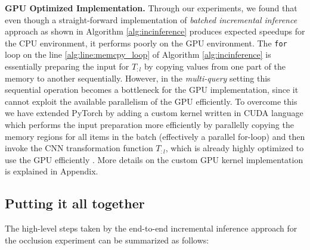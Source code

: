 \vspace{2mm}
\noindent \textbf{GPU Optimized Implementation.}
Through our experiments, we found that even though a straight-forward implementation of \textit{batched incremental inference} approach as shown in Algorithm \ref{alg:incinference} produces expected speedups for the CPU environment, it performs poorly on the GPU environment.
The \texttt{for} loop on the line \ref{alg:line:memcpy_loop} of Algorithm \ref{alg:incinference} is essentially preparing the input for $T_{:l}$ by copying values from one part of the memory to another sequentially.
However, in the \textit{multi-query} setting this sequential operation becomes a bottleneck for the GPU implementation, since it cannot exploit the available parallelism of the GPU efficiently.
To overcome this we have extended PyTorch by adding a custom kernel written in CUDA language which performs the input preparation more efficiently by parallelly copying the memory regions for all items in the batch (effectively a parallel for-loop) and then invoke the CNN transformation function $T_{:l}$, which is already highly optimized to use the GPU efficiently \cite{chetlur2014cudnn}.
More details on the custom GPU kernel implementation is explained in Appendix.


\subsection{Putting it all together}

The high-level steps taken by the end-to-end incremental inference approach for the occlusion experiment can be summarized as follows:

